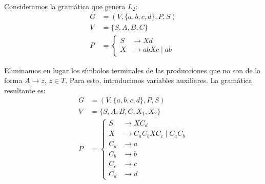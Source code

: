 \begin{ejercicio}
    Consideramos la gramática que genera $L_2$:
    \begin{equation*}
        \begin{aligned}
            G &= (V,\{a,b,c,d\},P,S) \\
            V &= \{ S, A, B, C \} \\
            P &= \left\{
                \begin{aligned}
                    S &\rightarrow Xd\\
                    X &\rightarrow abXc \mid ab
                \end{aligned}
            \right.
        \end{aligned}
    \end{equation*}

    Eliminamos en lugar los símbolos terminales de las producciones que no son de la forma $A\to z$, $z\in T$. Para esto, introducimos variables auxiliares. La gramática resultante es:
    \begin{equation*}
        \begin{aligned}
            G &= (V,\{a,b,c,d\},P,S) \\
            V &= \{ S, A, B, C, X_1, X_2 \} \\
            P &= \left\{
                \begin{aligned}
                    S &\rightarrow XC_d\\
                    X &\rightarrow C_aC_bXC_c \mid C_aC_b\\
                    C_a &\rightarrow a\\
                    C_b &\rightarrow b\\
                    C_c &\rightarrow c\\
                    C_d &\rightarrow d
                \end{aligned}
            \right.
        \end{aligned}
    \end{equation*}


\end{ejercicio}
